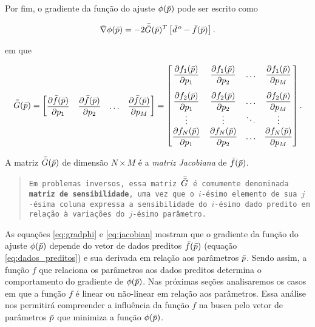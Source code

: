 \noindent Por fim, o gradiente da função do ajuste $\phi(\bar{p})$ pode ser
escrito como

\begin{equation}
\bar{\nabla} \phi(\bar{p}) = -2\bar{\bar{G}}(\bar{p})^T
    \left[\bar{d}^{\thinspace o} - \bar{f}(\bar{p})\right].
\label{eq:gradphi}
\end{equation}

\noindent em que 

\begin{equation}
\mat{G}(\vect{p}) = 
\begin{bmatrix}
    \dfrac{\partial\vect{f}(\vect{p})}{\partial p_1} &
    \dfrac{\partial\vect{f}(\vect{p})}{\partial p_2} &
    \ldots &
    \dfrac{\partial\vect{f}(\vect{p})}{\partial p_M}
\end{bmatrix}
=
\begin{bmatrix}
    \dfrac{\partial f_1(\vect{p})}{\partial p_1} &
        \dfrac{\partial f_1(\vect{p})}{\partial p_2} &
        \ldots &
        \dfrac{\partial f_1(\vect{p})}{\partial p_M}
    \vspace{0.3cm}\\
    \dfrac{\partial f_2(\vect{p})}{\partial p_1} &
        \dfrac{\partial f_2(\vect{p})}{\partial p_2} &
        \ldots & 
        \dfrac{\partial f_2(\vect{p})}{\partial p_M}
    \\
    \vdots & \vdots & \ddots & \vdots
    \\
    \dfrac{\partial f_N(\vect{p})}{\partial p_1} &
        \dfrac{\partial f_N(\vect{p})}{\partial p_2} &
        \ldots & 
        \dfrac{\partial f_N(\vect{p})}{\partial p_M}        
\end{bmatrix}.
\label{eq:jacobian}
\end{equation}

\noindent A matriz $\bar{\bar{G}}(\bar{p})$ de dimensão $N \times M$ é a
{\it matriz Jacobiana} de $\bar{f}(\bar{p})$.

\begin{quote}
{\tt Em problemas inversos, essa matriz $\bar{\bar{G}}$ é comumente denominada
{\bf matriz de sensibilidade}, uma vez que o $i$-ésimo elemento de sua $j$-ésima
coluna expressa a sensibilidade do $i$-ésimo dado pre\-di\-to em re\-la\-ção à variações
do $j$-ésimo parâmetro.}
\end{quote}

\indent As equações \ref{eq:gradphi} e \ref{eq:jacobian} mostram que o gradiente
da função do ajuste $\phi(\bar{p})$ depende do vetor de dados preditos
$\bar{f}(\bar{p})$ (equação \ref{eq:dados_preditos}) e sua derivada em relação
aos parâmetros $\bar{p}$.
Sendo assim, a função $f$ que relaciona os parâmetros aos dados preditos determina
o comportamento do gradiente de $\phi(\bar{p})$.
Nas próximas seções analisaremos os casos em que a função $f$ é linear ou
não-linear em relação aos parâmetros.
Essa análise nos permitirá compreender a influência da função $f$ na busca pelo
vetor de parâmetros $\tilde{p}$ que minimiza a função $\phi(\bar{p})$.



